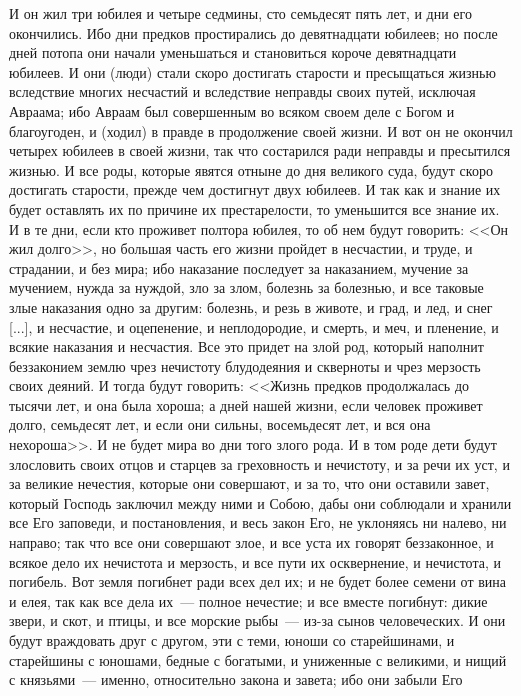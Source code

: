 И он жил три юбилея и четыре седмины, сто
семьдесят пять лет, и дни его окончились. Ибо дни
предков простирались до девятнадцати юбилеев; но
после дней потопа они начали уменьшаться и
становиться короче девятнадцати юбилеев. И они
(люди) стали скоро достигать старости и
пресыщаться жизнью вследствие многих несчастий
и вследствие неправды своих путей, исключая
Авраама; ибо Авраам был совершенным во всяком
своем деле с Богом и благоугоден, и (ходил) в
правде в продолжение своей жизни. И вот он не
окончил четырех юбилеев в своей жизни, так что
состарился ради неправды и пресытился жизнью. И
все роды, которые явятся отныне до дня великого
суда, будут скоро достигать старости, прежде чем
достигнут двух юбилеев. И так как и знание их
будет оставлять их по причине их престарелости,
то уменьшится все знание их. И в те дни, если кто
проживет полтора юбилея, то об нем будут
говорить: <<Он жил долго>>, но большая часть
его жизни пройдет в несчастии, и труде, и
страдании, и без мира; ибо наказание последует за
наказанием, мучение за мучением, нужда за нуждой,
зло за злом, болезнь за болезнью, и все таковые
злые наказания одно за другим: болезнь, и резь в
животе, и град, и лед, и снег [...], и несчастие, и
оцепенение, и неплодородие, и смерть, и меч, и
пленение, и всякие наказания и несчастия. Все это
придет на злой род, который наполнит беззаконием
землю чрез нечистоту блудодеяния и скверноты и
чрез мерзость своих деяний. И тогда будут
говорить: <<Жизнь предков продолжалась до
тысячи лет, и она была хороша; а дней нашей жизни,
если человек проживет долго, семьдесят лет, и
если они сильны, восемьдесят лет, и вся она
нехороша>>. И не будет мира во дни того злого
рода. И в том роде дети будут злословить своих
отцов и старцев за греховность и нечистоту, и за
речи их уст, и за великие нечестия, которые они
совершают, и за то, что они оставили завет,
который Господь заключил между ними и Собою, дабы
они соблюдали и хранили все Его заповеди, и
постановления, и весь закон Его, не уклоняясь ни
налево, ни направо; так что все они совершают
злое, и все уста их говорят беззаконное, и всякое
дело их нечистота и мерзость, и все пути их
осквернение, и нечистота, и погибель. Вот земля
погибнет ради всех дел их; и не будет более семени
от вина и елея, так как все дела их~--- полное
нечестие; и все вместе погибнут: дикие звери, и
скот, и птицы, и все морские рыбы~--- из-за сынов
человеческих. И они будут враждовать друг с
другом, эти с теми, юноши со старейшинами, и
старейшины с юношами, бедные с богатыми, и
униженные с великими, и нищий с князьями~--- именно,
относительно закона и завета; ибо они забыли Его
